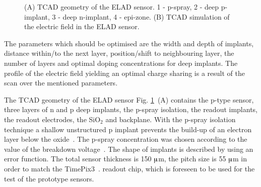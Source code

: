 \begin{figure}[t]
\begin{minipage}[h]{0.39\linewidth}
\end{minipage}
\begin{minipage}[h]{0.2\linewidth}
\end{minipage}
\caption[short description here]
 {(A) TCAD geometry of the ELAD sensor. 1 - p-spray, 2 - deep p-implant, 3 - deep n-implant, 4 - epi-zone. 
 (B) TCAD simulation of the electric field in the ELAD sensor. 
 }
\label{fig:geo-elfield}
\end{figure}

The parameters which should be optimised are the width and depth of implants, distance within/to the next layer, position/shift to neighbouring layer,
 the number of layers and optimal doping concentrations for deep implants.
The profile of the electric field yielding an optimal charge sharing is a result of the scan over the mentioned parameters. 

The TCAD geometry of the ELAD sensor Fig. \ref{fig:geo-elfield}~(A) contains the p-type sensor, three layers of n and p deep implants, the p-spray isolation, the readout implants, the readout electrodes, the SiO${}_2$ and backplane. 
With the p-spray isolation technique a shallow unstructured p implant prevents the build-up of an electron layer below the oxide~\cite{Lutz}. 
The p-spray concentration was chosen according to the value of the breakdown voltage~\cite{Pellegrini}. 
The shape of implants is described by using an error function. 
The total sensor thickness is 150 $\muup$m, the pitch size is 55 $\muup$m in order to match the TimePix3~\cite{TimePix}. readout chip, which is foreseen to be used for the test of the prototype sensors. 

